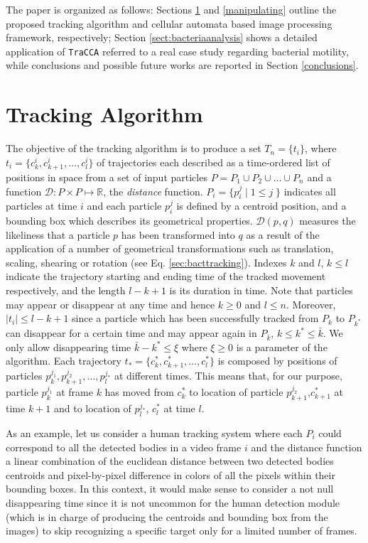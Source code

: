 The paper is organized as follows: Sections  \ref{trackalgorithm} and \ref{manipulating} outline the proposed tracking algorithm and cellular automata based image processing framework, respectively; Section \ref{sect:bacteriaanalysis} shows a detailed application of \texttt{TraCCA} referred to a real case study regarding bacterial motility, while conclusions and possible future works are reported in Section \ref{conclusions}.


\section{Tracking Algorithm}\label{trackalgorithm}
The objective of the tracking algorithm is to produce a 
set $ T_n = \{ t_i \}$, where $t_i=\{ c^i_k,c^i_{k+1},\ldots,c^i_l \} $ 
of trajectories each described as a time-ordered list of positions in space from a set of input 
particles $P=P_1 \cup P_2 \cup \ldots \cup P_n$ and a function $\mathcal{D} :  P \times P \mapsto \mathbb{R}$, 
the \textit{distance} function. $P_i = \{p^j_i \; | \; 1 \leq j\; \}$ indicates all particles at time $i$ and each particle $p_i^j$ is defined by a centroid position, and a bounding box which describes its geometrical properties.
$\mathcal{D}(p,q)$ measures the likeliness that a particle $p$ has been transformed into $q$ as a result of the application of a number of geometrical transformations such as translation, scaling, shearing or rotation (see Eq. \ref{sec:bacttracking}). 
Indexes $k$ and $l$, $k \leq l$ indicate the trajectory starting and ending time of the tracked movement respectively, and the length $l-k+1$ is its duration in time.
Note that particles may appear or disappear at any time and hence $k\geq 0$ and $l \leq n$. Moreover, $|t_i| \leq l-k+1$ since a particle which has been successfully tracked
 from  $P_k$ to $P_{k^*} $ can disappear for a certain time and may appear again in $P_{\bar{k}}$, $k \leq k^* \leq \bar{k}$. We only allow disappearing time $\bar{k}-k^* \leq \xi$ where $\xi \geq 0$ is a parameter of the algorithm. 
Each trajectory  $t_*=\{ c^*_k,c^*_{k+1},\ldots,c^*_l \} $ is composed by  positions of particles $p^{j_1}_k,p^{j_2}_{k+1},\ldots,p^{j_*}_l$ at different times. 
This means that, for our purpose, particle $p^{j_1}_k$ at frame $k$ has moved from $c^*_k$ to location of particle $p^{j_2}_{k+1}$,$c^*_{k+1}$ at time ${k+1}$ and to location of $p^{j_*}_{l}$, $c^*_l$ at time $l$. 

As an example, let us consider a human tracking system where each $P_i$ could correspond to all the detected bodies in a  video frame $i$ and the distance function a linear combination of the euclidean distance between two detected bodies centroids  and pixel-by-pixel difference in colors of all the pixels within their bounding boxes. In this context, it would make sense to consider a not null disappearing time since it is not uncommon for the human detection module (which is in charge of producing the centroids and bounding box from the images) to skip recognizing a specific target only for a limited number of frames. 


